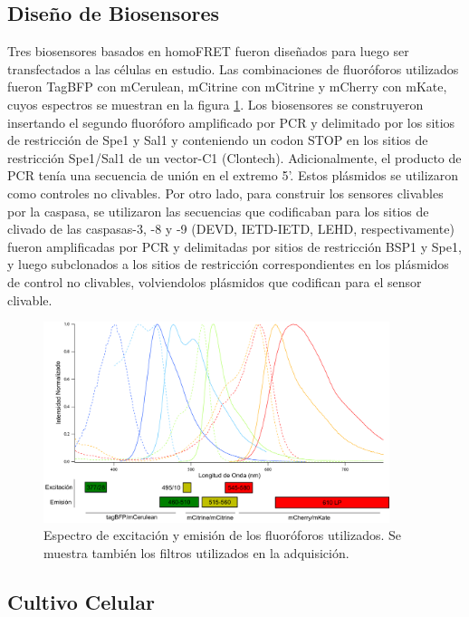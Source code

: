 \subsection{Diseño de Biosensores}

Tres biosensores basados en homoFRET fueron diseñados para luego ser transfectados a las células en estudio. Las combinaciones de fluoróforos utilizados fueron TagBFP con mCerulean, mCitrine con mCitrine y mCherry con mKate, cuyos espectros se muestran en la figura \ref{fig:EspectroFluos}. Los biosensores se construyeron insertando el segundo fluoróforo amplificado por PCR y delimitado por los sitios de restricción de Spe1 y Sal1 y conteniendo un codon STOP en los sitios de restricción Spe1/Sal1 de un vector-C1 (Clontech). Adicionalmente, el producto de PCR tenía una secuencia de unión en el extremo 5'. Estos plásmidos se utilizaron como controles no clivables. Por otro lado, para construir los sensores clivables por la caspasa, se utilizaron las secuencias que codificaban para los sitios de clivado de las caspasas-3, -8 y -9 (DEVD, IETD-IETD, LEHD, respectivamente) fueron amplificadas por PCR y delimitadas por sitios de restricción BSP1 y Spe1, y luego subclonados a los sitios de restricción correspondientes en los plásmidos de control no clivables, volviendolos plásmidos que codifican para el sensor clivable.

\begin{figure}
    \centering
    \includegraphics[width=0.9\textwidth]{./img/Cap4/spectra_w_filters.png}
    \caption{Espectro de excitación y emisión de los fluoróforos utilizados. Se muestra también los filtros utilizados en la adquisición.}
    \label{fig:EspectroFluos}
\end{figure}

\subsection{Cultivo Celular}

